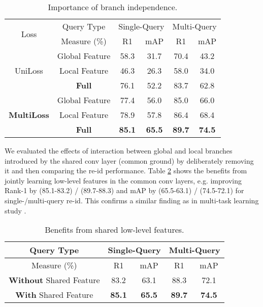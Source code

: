 \documentclass{article}
\begin{document}
\begin{table} [!h]
	\centering
	\footnotesize
\renewcommand{\arraystretch}{1}
	\setlength{\tabcolsep}{0.2 cm}
	\vspace{-0.3cm}
	\caption{\footnotesize
		Importance of branch independence.
	}
	\vskip 0pt \begin{tabular}{|c|c||cc|cc|}
		\hline
\multirow{2}{*}{Loss}
		& Query Type &  \multicolumn{2}{c|}{Single-Query} &\multicolumn{2}{c|}{Multi-Query} \\  \cline{2-6}& Measure (\%)    
		& R1 & mAP & R1 & mAP  \\ \hline \hline
		\multirow{3}{*}{UniLoss} 
		& Global Feature & 58.3 & 31.7 & 70.4 & 43.2\\   & Local Feature &  46.3 & 26.3 & 58.0 & 34.0\\ \cline{2-6}
		& \bf Full & 76.1 & 52.2 & 83.7 & 62.8  \\ 
		\hline   \multirow{3}{*}{\bf MultiLoss} 
		& Global Feature & 77.4 & 56.0 & 85.0 & 66.0\\   & Local Feature &  78.9& 57.8 & 86.4 & 68.4\\ \cline{2-6}
		& {\bf Full} & \textbf{85.1} &  \textbf{65.5}  &  \textbf{89.7} &  \textbf{74.5} \\
		\hline
	\end{tabular}\label{tab:individuality}
	\vspace{-0.3cm}
\end{table}


\vspace{0.1cm}
We evaluated the effects of interaction between global and local branches
introduced by the shared conv layer (common ground) by deliberately 
removing it and then comparing the re-id performance.
Table \ref{tab:common_conv} shows the benefits from 
jointly learning low-level features in the common conv layers,
e.g. improving Rank-1 by (85.1-83.2) / (89.7-88.3)
and mAP by (65.5-63.1) / (74.5-72.1) 
for single-/multi-query re-id.
This confirms a similar finding as in multi-task learning study \cite{argyriou2007multi}.   


\begin{table} [!h]
	\centering
	\footnotesize
\renewcommand{\arraystretch}{1}
	\setlength{\tabcolsep}{0.3 cm}
	\vspace{-0.3cm}
	\caption{\footnotesize
		Benefits from shared low-level features.
	}
	\vskip 0pt \begin{tabular}{|c|cc|cc|}
		\hline
Query Type &  \multicolumn{2}{c|}{Single-Query} &\multicolumn{2}{c|}{Multi-Query} \\ \hline
		Measure (\%)    
		& R1 & mAP & R1 & mAP  \\ \hline \hline
		{\bf Without} Shared Feature & 83.2 & 63.1 & 88.3 & 72.1
		\\ \hline
		{\bf With} Shared Feature & 
		\textbf{85.1} &  \textbf{65.5}  &  \textbf{89.7} &  \textbf{74.5} \\ \hline   \end{tabular}\label{tab:common_conv}
	\vspace{-0.3cm}
\end{table}
\end{document}
